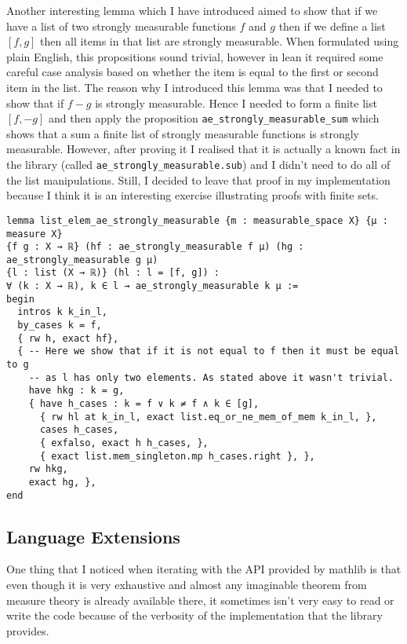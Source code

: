 \documentclass[11pt]{article}
\newenvironment{code}{\captionsetup{type=listing}}{}
\begin{document}
Another interesting lemma which I have introduced aimed to show that if we have
a list of two strongly measurable functions $f$ and  $g$ then if we define a list
$[f, g]$ then all items in that list are strongly measurable. When formulated using
plain English, this propositions sound trivial, however in lean it required some
careful case analysis based on whether the item is equal to the first or second
item in the list. The reason why I introduced this lemma was that I needed to show
that if $f - g$ is strongly
measurable. Hence I needed to form a finite list $[f, -g]$ and then apply the
proposition \texttt{ae\_strongly\_measurable\_sum}  which shows that a sum a finite
list of strongly measurable functions is strongly measurable. However,
after proving it I realised that it is actually a known fact in the
library (called \texttt{ae\_strongly\_measurable.sub}) and I didn't need to do
all of the list manipulations. Still, I decided to leave that proof in my implementation
because I think it is an interesting exercise illustrating proofs with finite sets.
\begin{code}
\begin{verbatim}
lemma list_elem_ae_strongly_measurable {m : measurable_space X} {μ : measure X}
{f g : X → ℝ} (hf : ae_strongly_measurable f μ) (hg : ae_strongly_measurable g μ)
{l : list (X → ℝ)} (hl : l = [f, g]) :
∀ (k : X → ℝ), k ∈ l → ae_strongly_measurable k μ :=
begin
  intros k k_in_l,
  by_cases k = f,
  { rw h, exact hf},
  { -- Here we show that if it is not equal to f then it must be equal to g
    -- as l has only two elements. As stated above it wasn't trivial.
    have hkg : k = g,
    { have h_cases : k = f ∨ k ≠ f ∧ k ∈ [g],
      { rw hl at k_in_l, exact list.eq_or_ne_mem_of_mem k_in_l, },
      cases h_cases,
      { exfalso, exact h h_cases, },
      { exact list.mem_singleton.mp h_cases.right }, },
    rw hkg,
    exact hg, },
end
\end{verbatim}
\end{code}

\subsection*{Language Extensions}

One thing that I noticed when iterating with the API provided by mathlib is that
even though it is very exhaustive and almost any imaginable theorem from measure
theory is already available there, it sometimes isn't very easy to read or write
the code because of the verbosity of the implementation that the library provides.
\end{document}
